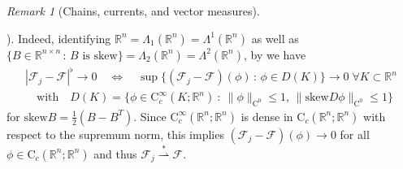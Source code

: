 \documentclass[10pt,a4paper,oneside,final]{article}
\newcommand{\R}{{\mathbb{R}}}
\newcommand{\flatNorm}[1]{|#1|^\flat}
\newcommand{\weakstarto}{\stackrel{*}{\rightharpoonup}}
\newcommand{\cont}{{\mathrm{C}}}
\newcommand{\contsmooth}{\cont_{c}^{\infty}}
\newcommand{\flux}{{\mathcal{F}}}
\numberwithin{equation}{section}
\theoremstyle{plain}
\theoremstyle{definition}
\theoremstyle{remark}
\newtheorem{remark}[theorem]{Remark}
\newcommand{\notinclude}[1]{}
\begin{document}
\begin{remark}[Chains, currents, and vector measures]
\begin{enumerate}
\notinclude{$A_\varepsilon=\varepsilon^{-1/2}(\delta_{-\varepsilon}+\delta_\varepsilon)\to0$ in flat norm, but mass diverges; also, $\sum_{j=1}^\infty A_{1/j^3}$ is a flat chain with infinite mass; flat convergence of boundary follows from \cite[4.1.12]{Fe69}}%
).
Indeed, identifying $\R^n=\Lambda_1(\R^n)=\Lambda^1(\R^n)$ as well as $\{B\in\R^{n\times n}\,:\,B\text{ is skew}\}=\Lambda_2(\R^n)=\Lambda^2(\R^n)$, by \cite[4.1.12]{Fe69} we have
\begin{multline*}
\flatNorm{\flux_j-\flux}\to0
\quad\Leftrightarrow\quad
\sup\{(\flux_j-\flux)(\phi)\,:\,\phi\in D(K)\}\to0\;\forall K\subset\R^n\\
\quad\text{with}\quad
D(K)=\{\phi\in\contsmooth(K;\R^n)\ :\ \|\phi\|_{\cont^0}\leq1,\,\|\text{skew}D\phi\|_{\cont^0}\leq1\}
\end{multline*}
for $\text{skew}B=\frac12(B-B^T)$.
Since $\contsmooth(\R^n;\R^n)$ is dense in $\cont_c(\R^n;\R^n)$ with respect to the supremum norm,
this implies $(\flux_j-\flux)(\phi)\to0$ for all $\phi\in\cont_c(\R^n;\R^n)$ and thus $\flux_j\weakstarto\flux$.


\end{enumerate}
\end{remark}
\end{document}
